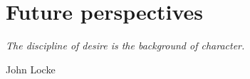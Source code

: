 \chapter{Future perspectives}
\label{ch:bkgest}
\epigraph{\emph{The discipline of desire is the background of character.}}{John Locke}
